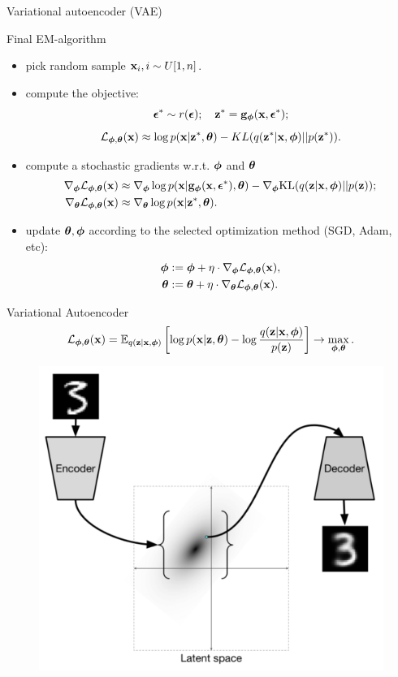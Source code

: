 \begin{frame}{Variational autoencoder (VAE)}
	\begin{block}{Final EM-algorithm}
		\begin{itemize}
			\item pick random sample $\bx_i, i \sim U[1, n]$.
			\item compute the objective:
			\vspace{-0.3cm}
			\[
				\bepsilon^* \sim r(\bepsilon); \quad \bz^* = \bg_{\bphi}(\bx, \bepsilon^*);
			\]
			\[
				\cL_{\bphi, \btheta}(\bx) \approx  \log p(\bx | \bz^*, \btheta) - KL(q(\bz^* | \bx, \bphi) || p(\bz^*)).
			\]
			\item compute a stochastic gradients w.r.t. $\bphi$ and $\btheta$
			\begin{align*}
				\nabla_{\bphi} \cL_{\bphi, \btheta}(\bx) &\approx \nabla_{\bphi} \log p(\bx | \bg_{\bphi}(\bx, \bepsilon^*), \btheta)  - \nabla_{\bphi} \text{KL}(q(\bz | \bx, \bphi) || p(\bz)); \\
				\nabla_{\btheta} \cL_{\bphi, \btheta}(\bx) &\approx \nabla_{\btheta} \log p(\bx|\bz^*, \btheta).
			\end{align*}
			\item update $\btheta, \bphi$ according to the selected optimization method (SGD, Adam, etc):
			\begin{align*}
				\bphi &:= \bphi + \eta \cdot \nabla_{\bphi} \cL_{\bphi, \btheta}(\bx), \\
				\btheta &:= \btheta + \eta \cdot \nabla_{\btheta} \cL_{\bphi, \btheta}(\bx).
			\end{align*}
		\end{itemize}
	\end{block}
\end{frame}
\begin{frame}{Variational Autoencoder}
	\[
	\cL_{\bphi, \btheta}(\bx)  = \mathbb{E}_{q(\bz | \bx, \bphi)} \left[\log p(\bx | \bz, \btheta) - \log \frac{q(\bz | \bx, \bphi)}{p(\bz)} \right] \rightarrow \max_{\bphi, \btheta}.
	\]	
	\vspace{-0.3cm}
	\begin{figure}[h]
		\centering
		\includegraphics[width=.65\linewidth]{figs/VAE}
	\end{figure}
\end{frame}
